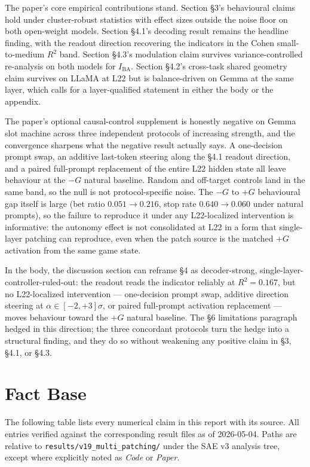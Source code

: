 \documentclass[11pt,a4paper]{article}
\begin{document}
The paper's core empirical contributions stand. Section \S3's behavioural claims hold under cluster-robust statistics with effect sizes outside the noise floor on both open-weight models. Section \S4.1's decoding result remains the headline finding, with the readout direction recovering the indicators in the Cohen small-to-medium $R^2$ band. Section \S4.3's modulation claim survives variance-controlled re-analysis on both models for $I_\text{BA}$. Section \S4.2's cross-task shared geometry claim survives on LLaMA at L22 but is balance-driven on Gemma at the same layer, which calls for a layer-qualified statement in either the body or the appendix.

The paper's optional causal-control supplement is honestly negative on Gemma slot machine across three independent protocols of increasing strength, and the convergence sharpens what the negative result actually says. A one-decision prompt swap, an additive last-token steering along the \S4.1 readout direction, and a paired full-prompt replacement of the entire L22 hidden state all leave behaviour at the $-G$ natural baseline. Random and off-target controls land in the same band, so the null is not protocol-specific noise. The $-G$ to $+G$ behavioural gap itself is large (bet ratio $0.051 \to 0.216$, stop rate $0.640 \to 0.060$ under natural prompts), so the failure to reproduce it under any L22-localized intervention is informative: the autonomy effect is not consolidated at L22 in a form that single-layer patching can reproduce, even when the patch source is the matched $+G$ activation from the same game state.

In the body, the discussion section can reframe \S4 as decoder-strong, single-layer-controller-ruled-out: the readout reads the indicator reliably at $R^2 = 0.167$, but no L22-localized intervention --- one-decision prompt swap, additive direction steering at $\alpha \in [-2,+3]\sigma$, or paired full-prompt activation replacement --- moves behaviour toward the $+G$ natural baseline. The \S6 limitations paragraph hedged in this direction; the three concordant protocols turn the hedge into a structural finding, and they do so without weakening any positive claim in \S3, \S4.1, or \S4.3.

\section*{Fact Base}

The following table lists every numerical claim in this report with its source. All entries verified against the corresponding result files as of 2026-05-04. Paths are relative to \texttt{results/v19\_multi\_patching/} under the SAE v3 analysis tree, except where explicitly noted as \emph{Code} or \emph{Paper}.
\end{document}
